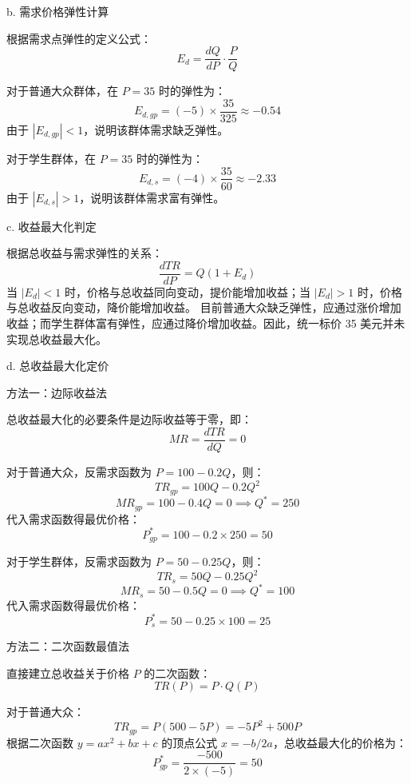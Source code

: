 \begin{enumerate}[label=\textbf{\arabic*.}, leftmargin=*]
\begin{center}
		\end{center}
		
		b. 需求价格弹性计算
		
		根据需求点弹性的定义公式：
		$$ E_d = \frac{dQ}{dP} \cdot \frac{P}{Q} $$
		
		对于普通大众群体，在 $P=35$ 时的弹性为：
		$$ E_{d,gp} = (-5) \times \frac{35}{325} \approx -0.54 $$
		由于 $|E_{d,gp}| < 1$，说明该群体需求缺乏弹性。
		
		对于学生群体，在 $P=35$ 时的弹性为：
		$$ E_{d,s} = (-4) \times \frac{35}{60} \approx -2.33 $$
		由于 $|E_{d,s}| > 1$，说明该群体需求富有弹性。
		
		c. 收益最大化判定
		
		根据总收益与需求弹性的关系：
		$$ \frac{dTR}{dP} = Q(1 + E_d) $$
		当 $|E_d| < 1$ 时，价格与总收益同向变动，提价能增加收益；当 $|E_d| > 1$ 时，价格与总收益反向变动，降价能增加收益。
		目前普通大众缺乏弹性，应通过涨价增加收益；而学生群体富有弹性，应通过降价增加收益。因此，统一标价 35 美元并未实现总收益最大化。
		
		d. 总收益最大化定价
		
		方法一：边际收益法
		
		总收益最大化的必要条件是边际收益等于零，即：
		$$ MR = \frac{dTR}{dQ} = 0 $$
		
		对于普通大众，反需求函数为 $P = 100 - 0.2Q$，则：
		$$ TR_{gp} = 100Q - 0.2Q^2 $$
		$$ MR_{gp} = 100 - 0.4Q = 0 \implies Q^* = 250 $$
		代入需求函数得最优价格：
		$$ P_{gp}^* = 100 - 0.2 \times 250 = 50 $$
		
		对于学生群体，反需求函数为 $P = 50 - 0.25Q$，则：
		$$ TR_s = 50Q - 0.25Q^2 $$
		$$ MR_s = 50 - 0.5Q = 0 \implies Q^* = 100 $$
		代入需求函数得最优价格：
		$$ P_s^* = 50 - 0.25\times 100 = 25 $$
		
		方法二：二次函数最值法
		
		直接建立总收益关于价格 $P$ 的二次函数：
		$$ TR(P) = P \cdot Q(P) $$
		
		对于普通大众：
		$$ TR_{gp} = P(500 - 5P) = -5P^2 + 500P $$
		根据二次函数 $y = ax^2 + bx + c$ 的顶点公式 $x = -b/2a$，总收益最大化的价格为：
		$$ P_{gp}^* = \frac{-500}{2 \times (-5)} = 50 $$
		

\end{enumerate}
